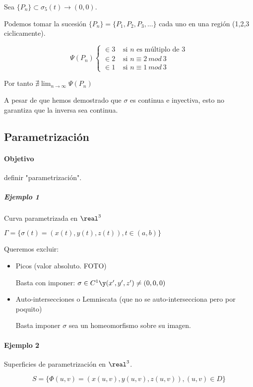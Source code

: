 Sea $\{P_n\}\subset \sigma_5(t) \rightarrow (0,0)$.

Podemos tomar la sucesión $\{P_n\} = \{P_1,P_2,P_3,...\}$ cada uno en una región (1,2,3 ciclicamente).

\[\Psi(P_n) \begin{cases}
\in 3 & \text{ si }n \text{ es múltiplo de }3\\
\in 2 & \text{ si } n\equiv 2\ mod \ 3\\
\in 1 & \text{ si } n \equiv 1\ mod \ 3
\end{cases}\]

Por tanto $\nexists \displaystyle \lim_{n\rightarrow \infty} \Psi(P_n)$

\begin{remark} A pesar de que hemos demostrado que $\sigma$ es continua e inyectiva, esto no garantiza que la inversa sea continua.\end{remark}

\subsection{Parametrización}

\paragraph{Objetivo} definir "parametrización".

\subparagraph{Ejemplo 1} Curva parametrizada en $\real^3$

$\Gamma = \{\sigma(t) = (x(t),y(t),z(t)), t \in (a,b)\}$

Queremos excluir:
\begin{itemize}
\item Picos (valor absoluto. FOTO) 

Basta con imponer: $\sigma \in C^1 \y (x',y',z') \neq (0,0,0)$

\item Auto-intersecciones o Lemniscata (que no se auto-intersecciona pero por poquito) 

Basta imponer $\sigma$ sea un homeomorfismo sobre su imagen.

\end{itemize}

\paragraph{Ejemplo 2} Superficies de parametrización en $\real^3$.

\[S = \{\Phi(u,v) = (x(u,v),y(u,v),z(u,v)), (u,v)\in D\}\]


